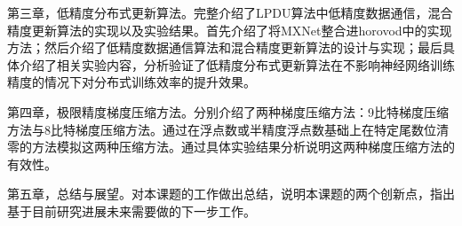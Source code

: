 第三章，低精度分布式更新算法。完整介绍了LPDU算法中低精度数据通信，混合精度更新算法的实现以及实验结果。首先介绍了将MXNet整合进horovod中的实现方法；然后介绍了低精度数据通信算法和混合精度更新算法的设计与实现；最后具体介绍了相关实验内容，分析验证了低精度分布式更新算法在不影响神经网络训练精度的情况下对分布式训练效率的提升效果。

第四章，极限精度梯度压缩方法。分别介绍了两种梯度压缩方法：9比特梯度压缩方法与8比特梯度压缩方法。通过在浮点数或半精度浮点数基础上在特定尾数位清零的方法模拟这两种压缩方法。通过具体实验结果分析说明这两种梯度压缩方法的有效性。

第五章，总结与展望。对本课题的工作做出总结，说明本课题的两个创新点，指出基于目前研究进展未来需要做的下一步工作。
